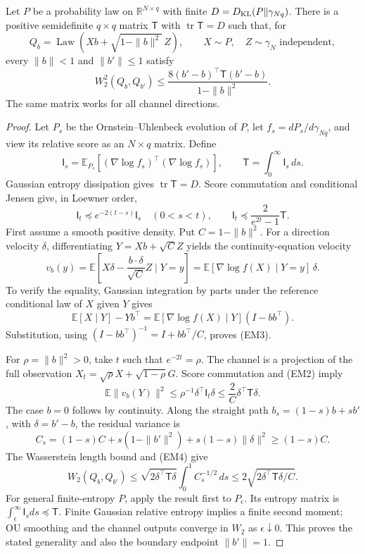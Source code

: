 \begin{lemma}
\label{lem:em-channel}
Let $P$ be a probability law on $\mathbb R^{N\times q}$ with finite
$D=D_{\rm KL}(P\Vert\gamma_{Nq})$. There is a positive semidefinite
$q\times q$ matrix $\mathsf T$ with $\operatorname{tr}\mathsf T=D$
such that, for
\[
 Q_b=\operatorname{Law}(Xb+\sqrt{1-\|b\|^2}\,Z),
 \qquad X\sim P,\quad Z\sim\gamma_N\text{ independent},
\]
every $\|b\|<1$ and $\|b'\|\le1$ satisfy
\[
 W_2^2(Q_b,Q_{b'})\le
 \frac{8(b'-b)^\top\mathsf T(b'-b)}{1-\|b\|^2}.
 \tag{EM1}
\]
The same matrix works for all channel directions.
\end{lemma}
\begin{proof}
Let $P_s$ be the Ornstein--Uhlenbeck evolution of $P$, let
$f_s=dP_s/d\gamma_{Nq}$, and view its relative score as an
$N\times q$ matrix. Define
\[
 \mathsf I_s=\mathbb E_{P_s}
       [(\nabla\log f_s)^\top(\nabla\log f_s)],
 \qquad \mathsf T=\int_0^\infty\mathsf I_s\,ds.
\]
Gaussian entropy dissipation gives $\operatorname{tr}\mathsf T=D$.
Score commutation and conditional Jensen give, in Loewner order,
\[
 \mathsf I_t\preceq e^{-2(t-s)}\mathsf I_s\quad(0<s<t),
 \qquad
 \mathsf I_t\preceq\frac{2}{e^{2t}-1}\mathsf T.
 \tag{EM2}
\]
First assume a smooth positive density. Put $C=1-\|b\|^2$.
For a direction velocity $\delta$, differentiating
$Y=Xb+\sqrt C Z$ yields the continuity-equation velocity
\[
 v_b(y)=\mathbb E\left[
       X\delta-\frac{b\cdot\delta}{\sqrt C}Z\mid Y=y\right]
       =\mathbb E[\nabla\log f(X)\mid Y=y]\,\delta.
 \tag{EM3}
\]
To verify the equality, Gaussian integration by parts under the
reference conditional law of $X$ given $Y$ gives
\[
 \mathbb E[X\mid Y]-Yb^\top
  =\mathbb E[\nabla\log f(X)\mid Y](I-bb^\top).
\]
Substitution, using $(I-bb^\top)^{-1}=I+bb^\top/C$, proves (EM3).

For $\rho=\|b\|^2>0$, take $t$ such that $e^{-2t}=\rho$.
The channel is a projection of the full observation
$X_t=\sqrt\rho X+\sqrt{1-\rho}G$.
Score commutation and (EM2) imply
\[
 \mathbb E\|v_b(Y)\|^2
 \le\rho^{-1}\delta^\top\mathsf I_t\delta
 \le\frac2C\delta^\top\mathsf T\delta.
 \tag{EM4}
\]
The case $b=0$ follows by continuity. Along the straight path
$b_s=(1-s)b+sb'$, with $\delta=b'-b$, the residual variance is
\[
 C_s=(1-s)C+s(1-\|b'\|^2)+s(1-s)\|\delta\|^2
       \ge(1-s)C.
\]
The Wasserstein length bound and (EM4) give
\[
 W_2(Q_b,Q_{b'})
 \le\sqrt{2\delta^\top\mathsf T\delta}
                   \int_0^1 C_s^{-1/2}\,ds
 \le2\sqrt{2\delta^\top\mathsf T\delta/C}.
\]
For general finite-entropy $P$, apply the result first to $P_\epsilon$.
Its entropy matrix is $\int_\epsilon^\infty\mathsf I_sds\preceq\mathsf T$.
Finite Gaussian relative entropy implies a finite second moment;
OU smoothing and the channel outputs converge in $W_2$ as
$\epsilon\downarrow0$. This proves the stated generality and also
the boundary endpoint $\|b'\|=1$.
\end{proof}

